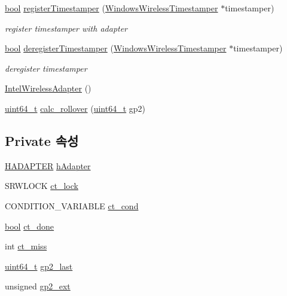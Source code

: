 \begin{DoxyCompactItemize}
\hyperlink{avb__gptp_8h_af6a258d8f3ee5206d682d799316314b1}{bool} \hyperlink{class_intel_wireless_adapter_a2952934f38db416cdb87c510634c0c72}{register\+Timestamper} (\hyperlink{class_windows_wireless_timestamper}{Windows\+Wireless\+Timestamper} $\ast$timestamper)
\begin{DoxyCompactList}\small\item\em register timestamper with adapter \end{DoxyCompactList}\item 
\hyperlink{avb__gptp_8h_af6a258d8f3ee5206d682d799316314b1}{bool} \hyperlink{class_intel_wireless_adapter_a4a39d6d7f3a9dd3e80b607cc2ffdac7f}{deregister\+Timestamper} (\hyperlink{class_windows_wireless_timestamper}{Windows\+Wireless\+Timestamper} $\ast$timestamper)
\begin{DoxyCompactList}\small\item\em deregister timestamper \end{DoxyCompactList}\item 
\hyperlink{class_intel_wireless_adapter_a0ca67f8fe942dfd50878f6b93623780b}{Intel\+Wireless\+Adapter} ()
\item 
\hyperlink{parse_8c_aec6fcb673ff035718c238c8c9d544c47}{uint64\+\_\+t} \hyperlink{class_intel_wireless_adapter_a697968213113c89339437ec1a297291a}{calc\+\_\+rollover} (\hyperlink{parse_8c_aec6fcb673ff035718c238c8c9d544c47}{uint64\+\_\+t} gp2)
\end{DoxyCompactItemize}
\subsection*{Private 속성}
\begin{DoxyCompactItemize}
\item 
\hyperlink{intel__wireless_8hpp_a1ba56f890e3019aba9c5e10c7b1f9196}{H\+A\+D\+A\+P\+T\+ER} \hyperlink{class_intel_wireless_adapter_a691881600d67a63fef617bf58a70736c}{h\+Adapter}
\item 
S\+R\+W\+L\+O\+CK \hyperlink{class_intel_wireless_adapter_a5fa67f021cca2b2c598bbc494b119fe9}{ct\+\_\+lock}
\item 
C\+O\+N\+D\+I\+T\+I\+O\+N\+\_\+\+V\+A\+R\+I\+A\+B\+LE \hyperlink{class_intel_wireless_adapter_abf7f0ddf827ae4bd5c82ab47f06e5328}{ct\+\_\+cond}
\item 
\hyperlink{avb__gptp_8h_af6a258d8f3ee5206d682d799316314b1}{bool} \hyperlink{class_intel_wireless_adapter_ab7386280881b5fe0d79562d65f42152b}{ct\+\_\+done}
\item 
int \hyperlink{class_intel_wireless_adapter_a8926532f4aef8773a0afb7646863188a}{ct\+\_\+miss}
\item 
\hyperlink{parse_8c_aec6fcb673ff035718c238c8c9d544c47}{uint64\+\_\+t} \hyperlink{class_intel_wireless_adapter_aca863ce22ff3c9a0f9e9c2d9ac54459d}{gp2\+\_\+last}
\item 
unsigned \hyperlink{class_intel_wireless_adapter_a93125aa51356104c4ce2f8842251d733}{gp2\+\_\+ext}
\end{DoxyCompactItemize}
